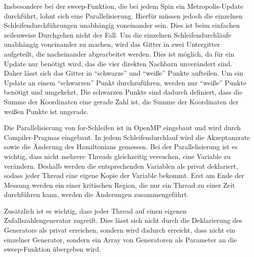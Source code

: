 \documentclass{scrreprt}
\begin{document}
	Insbesondere bei der sweep-Funktion, die bei jedem Spin ein Metropolis-Update durchführt, lohnt sich eine Parallelisierung. Hierfür müssen jedoch die einzelnen Schleifendurchführungen unabhängig voneinander sein. Dies ist beim einfachen zeilenweise Durchgehen nicht der Fall.
	Um die einzelnen Schleifendurchläufe unabhängig voneinander zu machen, wird das Gitter in zwei Untergitter aufgeteilt, die nacheinander abgearbeitet werden. Dies ist möglich, da für ein Update nur benötigt wird, das die vier direkten Nachbarn unverändert sind. Daher lässt sich das Gitter in \enquote{schwarze}
	und \enquote{weiße} Punkte aufteilen. Um ein Update an einem \enquote{schwarzen} Punkt durchzuführen, werden nur \enquote{weiße} Punkte benötigt und umgekehrt. Die schwarzen Punkte sind dadurch definiert, dass die Summe der Koordinaten eine gerade Zahl ist, die Summe der Koordinaten der weißen Punkte ist ungerade.
	
	Die Parallelisierung von for-Schleifen ist in OpenMP eingebaut und wird durch Compiler-Pragmas eingebaut. In jedem Schleifendurchlauf wird die Akzeptanzrate sowie die Änderung des Hamiltonians gemessen. Bei der Parallelisierung ist es wichtig, dass nicht mehrere Threads gleichzeitig versuchen, eine Variable zu verändern. Deshalb werden die entsprechenden Variablen als privat deklariert, sodass jeder Thread eine eigene Kopie der Variable bekommt. Erst am Ende der Messung werden ein einer kritischen Region, die nur ein Thread zu einer Zeit durchführen kann, werden die Änderungen zusammengeführt. 	%
	
	
	Zusätzlich ist es wichtig, dass jeder Thread auf einen eigenen Zufallszahlengenerator zugreift. Dies lässt sich nicht durch die Deklarierung des Generators als privat erreichen, sondern wird dadurch erreicht, dass nicht ein einzelner Generator, sondern ein Array von Generatoren als Parameter an die sweep-Funktion übergeben wird.
	
\end{document}
